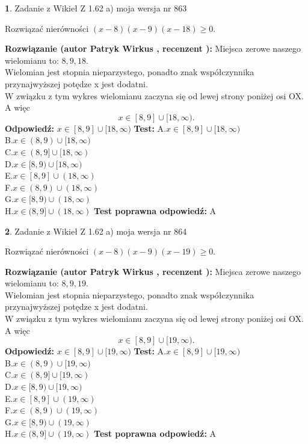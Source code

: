 \documentclass[12pt, a4paper]{article}
\theoremstyle{definition} %
\newtheorem{zad}{}
\newcommand{\zadStart}[1]{\begin{zad}#1\newline}
\newcommand{\zadStop}{\end{zad}}
\newcommand{\rozwStart}[2]{\noindent \textbf{Rozwiązanie (autor #1 , recenzent #2): }\newline}
\newcommand{\rozwStop}{\newline}
\newcommand{\odpStart}{\noindent \textbf{Odpowiedź:}\newline}
\newcommand{\odpStop}{\newline}
\newcommand{\testStart}{\noindent \textbf{Test:}\newline}
\newcommand{\testStop}{\newline}
\newcommand{\kluczStart}{\noindent \textbf{Test poprawna odpowiedź:}\newline}
\newcommand{\kluczStop}{\newline}
\begin{document}
\zadStart{Zadanie z Wikieł Z 1.62 a) moja wersja nr 863}

Rozwiązać nierówności $(x-8)(x-9)(x-18)\ge0$.
\zadStop
\rozwStart{Patryk Wirkus}{}
Miejsca zerowe naszego wielomianu to: $8, 9, 18$.\\
Wielomian jest stopnia nieparzystego, ponadto znak współczynnika przy\linebreak najwyższej potędze x jest dodatni.\\ W związku z tym wykres wielomianu zaczyna się od lewej strony poniżej osi OX. A więc $$x \in [8,9] \cup [18,\infty).$$
\rozwStop
\odpStart
$x \in [8,9] \cup [18,\infty)$
\odpStop
\testStart
A.$x \in [8,9] \cup [18,\infty)$\\
B.$x \in (8,9) \cup [18,\infty)$\\
C.$x \in (8,9] \cup [18,\infty)$\\
D.$x \in [8,9) \cup [18,\infty)$\\
E.$x \in [8,9] \cup (18,\infty)$\\
F.$x \in (8,9) \cup (18,\infty)$\\
G.$x \in [8,9) \cup (18,\infty)$\\
H.$x \in (8,9] \cup (18,\infty)$
\testStop
\kluczStart
A
\kluczStop



\zadStart{Zadanie z Wikieł Z 1.62 a) moja wersja nr 864}

Rozwiązać nierówności $(x-8)(x-9)(x-19)\ge0$.
\zadStop
\rozwStart{Patryk Wirkus}{}
Miejsca zerowe naszego wielomianu to: $8, 9, 19$.\\
Wielomian jest stopnia nieparzystego, ponadto znak współczynnika przy\linebreak najwyższej potędze x jest dodatni.\\ W związku z tym wykres wielomianu zaczyna się od lewej strony poniżej osi OX. A więc $$x \in [8,9] \cup [19,\infty).$$
\rozwStop
\odpStart
$x \in [8,9] \cup [19,\infty)$
\odpStop
\testStart
A.$x \in [8,9] \cup [19,\infty)$\\
B.$x \in (8,9) \cup [19,\infty)$\\
C.$x \in (8,9] \cup [19,\infty)$\\
D.$x \in [8,9) \cup [19,\infty)$\\
E.$x \in [8,9] \cup (19,\infty)$\\
F.$x \in (8,9) \cup (19,\infty)$\\
G.$x \in [8,9) \cup (19,\infty)$\\
H.$x \in (8,9] \cup (19,\infty)$
\testStop
\kluczStart
A
\kluczStop
\end{document}
